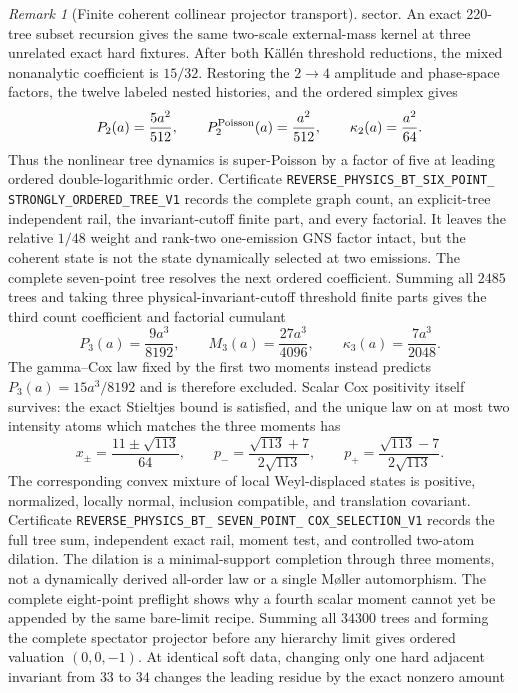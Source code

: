 \documentclass[11pt]{article}
\theoremstyle{definition}
\theoremstyle{remark}
\newtheorem{remark}[theorem]{Remark}
\begin{document}
\begin{remark}[Finite coherent collinear projector transport]
sector.  An exact 220-tree subset recursion gives the same two-scale
external-mass kernel at three unrelated exact hard fixtures.  After both
K\"all\'en threshold reductions,
the mixed nonanalytic coefficient is $15/32$.  Restoring the $2\to4$
amplitude and phase-space factors, the twelve labeled nested histories, and
the ordered simplex gives
\[
 P_2(a)=\frac{5a^2}{512},\qquad
 P_2^{\rm Poisson}(a)=\frac{a^2}{512},\qquad
 \kappa_2(a)=\frac{a^2}{64}.
\]
Thus the nonlinear tree dynamics is super-Poisson by a factor of five at
leading ordered double-logarithmic order.  Certificate
\texttt{REVERSE\_PHYSICS\_BT\_SIX\_POINT\_}
\allowbreak\texttt{STRONGLY\_ORDERED\_TREE\_V1}
records the complete graph count, an explicit-tree independent rail, the
invariant-cutoff finite part, and every factorial.  It leaves the relative
$1/48$ weight and rank-two one-emission GNS factor intact, but the coherent
state is not the state dynamically selected at two emissions.  The complete
seven-point tree resolves the next ordered coefficient.  Summing all $2485$
trees and taking three physical-invariant-cutoff threshold finite parts gives
the third count coefficient and factorial cumulant
\[
 P_3(a)=\frac{9a^3}{8192},\qquad
 M_3(a)=\frac{27a^3}{4096},\qquad
 \kappa_3(a)=\frac{7a^3}{2048}.
\]
The gamma--Cox law fixed by the first two moments instead predicts
$P_3(a)=15a^3/8192$ and is therefore excluded.  Scalar Cox positivity itself
survives: the exact Stieltjes bound is satisfied, and the unique law on at
most two intensity atoms which matches the three moments has
\[
 x_\pm=\frac{11\pm\sqrt{113}}{64},\qquad
 p_-=\frac{\sqrt{113}+7}{2\sqrt{113}},\qquad
 p_+=\frac{\sqrt{113}-7}{2\sqrt{113}}.
\]
The corresponding convex mixture of local Weyl-displaced states is positive,
normalized, locally normal, inclusion compatible, and translation covariant.
Certificate
\texttt{REVERSE\_PHYSICS\_BT\_}
\allowbreak\texttt{SEVEN\_POINT\_}
\allowbreak\texttt{COX\_SELECTION\_V1}
records the full tree sum, independent exact rail, moment test, and controlled
two-atom dilation.  The dilation is a minimal-support completion through three
moments, not a dynamically derived all-order law or a single M\o ller
automorphism.  The complete eight-point preflight shows why a fourth scalar
moment cannot yet be appended by the same bare-limit recipe.  Summing all
$34300$ trees and forming the complete spectator projector before any
hierarchy limit gives ordered valuation $(0,0,-1)$.  At identical soft data,
changing only one hard adjacent invariant from $33$ to $34$ changes the
leading residue by the exact nonzero amount

\end{remark}
\end{document}
